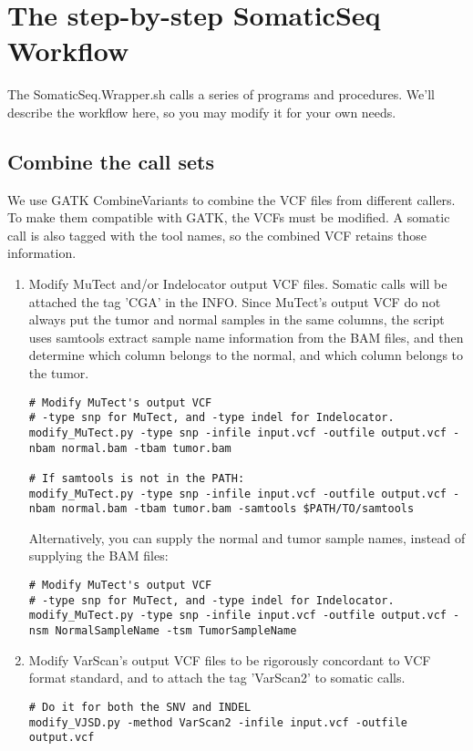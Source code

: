 \documentclass[10pt,letterpaper]{article}
\begin{document}
\begin{sloppypar}
\section{The step-by-step SomaticSeq Workflow}

The SomaticSeq.Wrapper.sh calls a series of programs and procedures. We'll describe the workflow here, so you may modify it for your own needs. 


\subsection{Combine the call sets}
	We use GATK CombineVariants to combine the VCF files from different callers. To make them compatible with GATK, the VCFs must be modified. A somatic call is also tagged with the tool names, so the combined VCF retains those information. 

\begin{enumerate}

\item 
Modify MuTect and/or Indelocator output VCF files. Somatic calls will be attached the tag 'CGA' in the INFO. 
Since MuTect's output VCF do not always put the tumor and normal samples in the same columns, the script uses samtools extract sample name information from the BAM files, and then determine which column belongs to the normal, and which column belongs to the tumor. 
	
\begin{lstlisting}
# Modify MuTect's output VCF
# -type snp for MuTect, and -type indel for Indelocator.
modify_MuTect.py -type snp -infile input.vcf -outfile output.vcf -nbam normal.bam -tbam tumor.bam
	
# If samtools is not in the PATH:
modify_MuTect.py -type snp -infile input.vcf -outfile output.vcf -nbam normal.bam -tbam tumor.bam -samtools $PATH/TO/samtools
\end{lstlisting}
	
Alternatively, you can supply the normal and tumor sample names, instead of supplying the BAM files:
\begin{lstlisting}
# Modify MuTect's output VCF
# -type snp for MuTect, and -type indel for Indelocator.
modify_MuTect.py -type snp -infile input.vcf -outfile output.vcf -nsm NormalSampleName -tsm TumorSampleName
\end{lstlisting}

\item
Modify VarScan's output VCF files to be rigorously concordant to VCF format standard, and to attach the tag 'VarScan2' to somatic calls. 
\begin{lstlisting}
# Do it for both the SNV and INDEL
modify_VJSD.py -method VarScan2 -infile input.vcf -outfile output.vcf
\end{lstlisting}
	


\end{enumerate}
\end{sloppypar}
\end{document}
